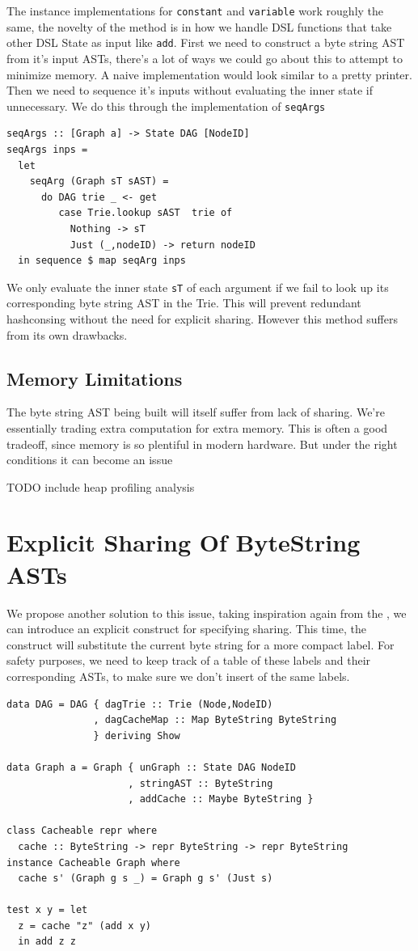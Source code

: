 \documentclass[runningheads]{llncs}
\begin{document}
The instance implementations for \texttt{constant} and
\texttt{variable} work roughly the same, the novelty of the method
is in how we handle DSL functions that take other DSL State as input like
\texttt{add}. First we need to construct a byte string AST from
it's input ASTs, there's a lot of ways we could go about this to attempt to
minimize memory. A naive implementation would look similar to a pretty printer.
Then we need to sequence it's inputs without evaluating the inner state if
unnecessary. We do this through the implementation of \texttt{seqArgs}
\begin{verbatim}
seqArgs :: [Graph a] -> State DAG [NodeID]
seqArgs inps =
  let
    seqArg (Graph sT sAST) =
      do DAG trie _ <- get
         case Trie.lookup sAST  trie of
           Nothing -> sT
           Just (_,nodeID) -> return nodeID
  in sequence $ map seqArg inps
\end{verbatim}

We only evaluate the inner state \texttt{sT} of each argument if we
fail to look up its corresponding byte string AST in the Trie. This will prevent
redundant hashconsing without the need for explicit sharing. However this method
suffers from its own drawbacks.

\subsection{Memory Limitations}
The byte string AST being built will itself suffer from lack of sharing. We're
essentially trading extra computation for extra memory. This is often a good
tradeoff, since memory is so plentiful in modern hardware. But under the right
conditions it can become an issue

TODO include heap profiling analysis

\section{Explicit Sharing Of ByteString ASTs}
We propose another solution to this issue, taking inspiration again from the
\cite{kiselyov:sharing}, we can introduce an explicit construct for specifying
sharing. This time, the construct will substitute the current byte string for a
more compact label. For safety purposes, we need to keep track of a table of
these labels and their corresponding ASTs, to make sure we don't insert of the
same labels.
\begin{verbatim}
data DAG = DAG { dagTrie :: Trie (Node,NodeID)
               , dagCacheMap :: Map ByteString ByteString
               } deriving Show

data Graph a = Graph { unGraph :: State DAG NodeID
                     , stringAST :: ByteString
                     , addCache :: Maybe ByteString }

class Cacheable repr where
  cache :: ByteString -> repr ByteString -> repr ByteString
instance Cacheable Graph where
  cache s' (Graph g s _) = Graph g s' (Just s)

test x y = let
  z = cache "z" (add x y)
  in add z z
\end{verbatim}
\end{document}
